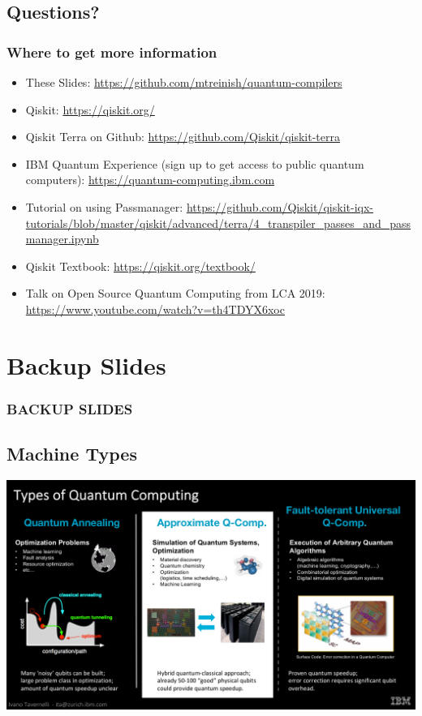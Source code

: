 \documentclass[aspectratio=169,11pt,hyperref={colorlinks=true}]{beamer}
\begin{document}
\subsection{Questions?}
\begin{frame}
\frametitle{Where to get more information}
    \begin{itemize}
        \item These Slides: \href{https://github.com/mtreinish/quantum-compilers}{https://github.com/mtreinish/quantum-compilers}
        \item Qiskit: \href{https://qiskit.org/}{https://qiskit.org/}
        \item Qiskit Terra on Github: \href{https://github.com/Qiskit/qiskit-terra}{https://github.com/Qiskit/qiskit-terra}
        \item IBM Quantum Experience (sign up to get access to public quantum computers): \href{https://quantum-computing.ibm.com}{https://quantum-computing.ibm.com}
        \item Tutorial on using Passmanager: {\small \href{https://github.com/Qiskit/qiskit-iqx-tutorials/blob/master/qiskit/advanced/terra/4\_transpiler\_passes\_and\_passmanager.ipynb}{https://github.com/Qiskit/qiskit-iqx-tutorials/blob/master/qiskit/advanced/terra/4\_transpiler\_passes\_and\_passmanager.ipynb}}
        \item Qiskit Textbook: \href{https://qiskit.org/textbook/}{https://qiskit.org/textbook/}
        \item Talk on Open Source Quantum Computing from LCA 2019: \href{https://www.youtube.com/watch?v=th4TDYX6xoc}{https://www.youtube.com/watch?v=th4TDYX6xoc}
    \end{itemize}
\end{frame}

\section{Backup Slides}
\begin{frame}[noframenumbering]
    \frametitle{BACKUP SLIDES}
\end{frame}

\subsection{Machine Types}
    \begin{frame}[noframenumbering]
        \includegraphics[width=\textwidth]{machine_types.png}
\end{frame}
\end{document}
